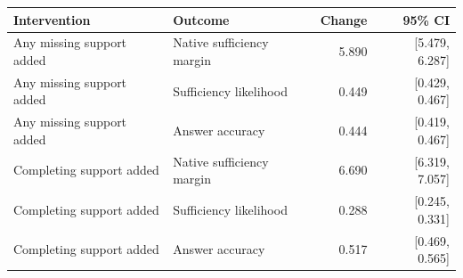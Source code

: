 \begin{tabular}{llrr}
\toprule
Intervention & Outcome & Change & 95\% CI \\
\midrule
Any missing support added & Native sufficiency margin & 5.890 & [5.479, 6.287] \\
Any missing support added & Sufficiency likelihood & 0.449 & [0.429, 0.467] \\
Any missing support added & Answer accuracy & 0.444 & [0.419, 0.467] \\
Completing support added & Native sufficiency margin & 6.690 & [6.319, 7.057] \\
Completing support added & Sufficiency likelihood & 0.288 & [0.245, 0.331] \\
Completing support added & Answer accuracy & 0.517 & [0.469, 0.565] \\
\bottomrule
\end{tabular}
